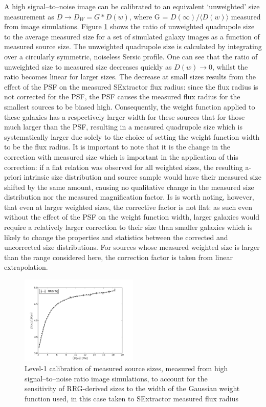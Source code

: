 \documentclass[useAMS,usenatbib,times,letter,amssymb]{mn2e}
\begin{document}
A high signal--to--noise image can be calibrated to an equivalent `unweighted' size measurement as $D \to D_{W} = G*D(w)$, where G = $D(\infty)/\langle D(w) \rangle$ measured from image simulations. Figure \ref{Fig:WCalib} shows the ratio of unweighted quadrupole size to the average measured size for a set of simulated galaxy images as a function of measured source size. The unweighted quadrupole size is calculated by integrating over a circularly symmetric, noiseless Sersic profile. One can see that the ratio of unweighted size to measured size decreases quickly as $D(w) \to 0$, whilst the ratio becomes linear for larger sizes. The decrease at small sizes results from the effect of the PSF on the measured SExtractor flux radius: since the flux radius is not corrected for the PSF, the PSF causes the measured flux radius for the smallest sources to be biased high. Consequently, the weight function applied to these galaxies has a respectively larger width for these sources that for those much larger than the PSF, resulting in a measured quadrupole size which is systematically larger due solely to the choice of setting the weight function width to be the flux radius. It is important to note that it is the change in the correction with measured size which is important in the application of this correction: if a flat relation was observed for all weighted sizes, the resulting a-priori intrinsic size distribution and source sample would have their measured size shifted by the same amount, causing no qualitative change in the measured size distribution nor the measured magnification factor. Is is worth noting, however, that even at larger weighted sizes, the corrective factor is not flat: as such even without the effect of the PSF on the weight function width, larger galaxies would require a relatively larger correction to their size than smaller galaxies which is likely to change the properties and statistics between the corrected and uncorrected size distributions. For sources whose measured weighted size is larger than the range considered here, the correction factor is taken from linear extrapolation.

\begin{figure}
\centering
\includegraphics[width = 0.5\textwidth]{Figures/Calibration_Plots/17April2015/Size_Distributions/Calibrations/WCalib/WCalib_TrJJ_MarginalisedEllipticity.pdf}
\caption{Level-1 calibration of measured source sizes, measured from high signal--to--noise ratio image simulations, to account for the sensitivity of RRG-derived sizes to the width of the Gaussian weight function used, in this case taken to SExtractor measured flux radius}\label{Fig:WCalib}
\end{figure}
\end{document}
